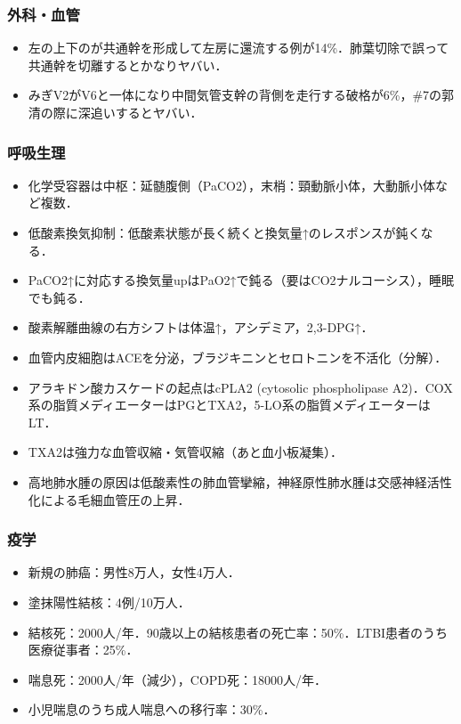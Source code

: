 \subsubsection{外科・血管}

\begin{itemize}
\item 左の上下のが共通幹を形成して左房に還流する例が14\%．肺葉切除で誤って共通幹を切離するとかなりヤバい．
\item みぎV2がV6と一体になり中間気管支幹の背側を走行する破格が6\%，\#7の郭清の際に深追いするとヤバい．

\end{itemize}


\subsubsection{呼吸生理}

\begin{itemize}
\item 化学受容器は中枢：延髄腹側（PaCO2），末梢：頸動脈小体，大動脈小体など複数．
\item 低酸素換気抑制：低酸素状態が長く続くと換気量↑のレスポンスが鈍くなる．
\item PaCO2↑に対応する換気量upはPaO2↑で鈍る（要はCO2ナルコーシス），睡眠でも鈍る．
\item 酸素解離曲線の右方シフトは体温↑，アシデミア，2,3-DPG↑．
\item 血管内皮細胞はACEを分泌，ブラジキニンとセロトニンを不活化（分解）．
\item アラキドン酸カスケードの起点はcPLA2 (cytosolic phospholipase A2)．COX系の脂質メディエーターはPGとTXA2，5-LO系の脂質メディエーターはLT．
\item TXA2は強力な血管収縮・気管収縮（あと血小板凝集）．
\item 高地肺水腫の原因は低酸素性の肺血管攣縮，神経原性肺水腫は交感神経活性化による毛細血管圧の上昇．
\end{itemize}


\subsubsection{疫学}

\begin{itemize}
\item 新規の肺癌：男性8万人，女性4万人．
\item 塗抹陽性結核：4例/10万人．
\item 結核死：2000人/年．90歳以上の結核患者の死亡率：50\%．LTBI患者のうち医療従事者：25\%．
\item 喘息死：2000人/年（減少），COPD死：18000人/年．
\item 小児喘息のうち成人喘息への移行率：30\%．
\end{itemize}


